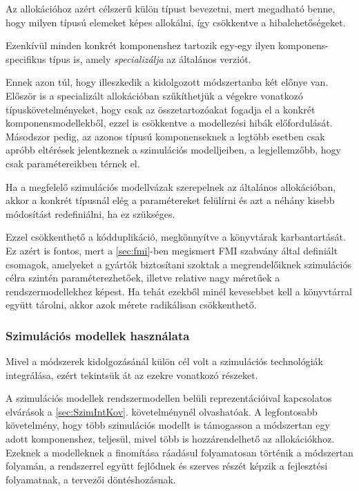         Az allokációhoz azért célszerű külön típust bevezetni, mert megadható benne, hogy milyen típusú elemeket képes allokálni, így csökkentve a hibalehetőségeket.
        
        Ezenkívül minden konkrét komponenshez tartozik egy-egy ilyen komponens-specifikus típus is, amely \emph{specializálja} az általános verziót.
        
        Ennek azon túl, hogy illeszkedik a kidolgozott módszertanba két előnye van.
        Először is a specializált allokációban szűkíthetjük a végekre vonatkozó típuskövetelményeket, hogy csak az összetartozóakat fogadja el a konkrét komponensmodellekből, ezzel is csökkentve a modellezési hibák előfordulását.
        Másodszor pedig, az azonos típusú komponenseknek a legtöbb esetben csak apróbb eltérések jelentkeznek a szimulációs modelljeiben, a legjellemzőbb, hogy csak paramétereikben térnek el.
        
        Ha a megfelelő szimulációs modellvázak szerepelnek az általános allokációban, akkor a konkrét típusnál elég a paramétereket felülírni és azt a néhány kisebb módosítást redefiniálni, ha ez szükséges.
        
        Ezzel csökkenthető a kódduplikáció, megkönnyítve a könyvtárak karbantartását. Ez azért is fontos, mert a \ref{sec:fmi}-ben megismert FMI szabvány által definiált csomagok, amelyeket a gyártók biztosítani szoktak a megrendelőiknek szimulációs célra szintén paraméterezhetőek, illetve relative nagy méretűek a rendszermodellekhez képest.
        Ha tehát ezekből minél kevesebbet kell a könyvtárral együtt tárolni, akkor azok mérete radikálisan csökkenthető.

        \subsubsection{Szimulációs modellek használata}
        Mivel a módszerek kidolgozásánál külön cél volt a szimulációs technológiák integrálása, ezért tekintsük át az ezekre vonatkozó részeket.
        
        A szimulációs modellek rendszermodellen belüli reprezentációival kapcsolatos elvárások a \ref{sec:SzimIntKov}. követelménynél olvashatóak. A legfontosabb követelmény, hogy több szimulációs modellt is támogasson a módszertan egy adott komponenshez, teljesül, mivel több is hozzárendelhető az allokációkhoz.
        Ezeknek a modelleknek a finomítása ráadásul folyamatosan történik a módszertan folyamán, a rendszerrel együtt fejlődnek és szerves részét képzik a fejlesztési folyamatnak, a tervezői döntéshozásnak.
        
